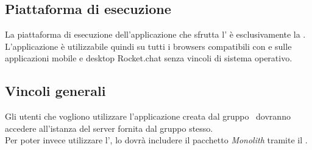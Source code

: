 \subsection{Piattaforma di esecuzione} 
La piattaforma di esecuzione dell'applicazione che sfrutta l' è esclusivamente la  . L'applicazione è utilizzabile quindi su tutti i browsers compatibili con  e sulle applicazioni mobile e desktop Rocket.chat senza vincoli di sistema operativo.

\subsection{Vincoli generali}
Gli utenti che vogliono utilizzare l'applicazione creata dal gruppo \gruppo\ dovranno accedere all'istanza del server fornita dal gruppo stesso. \\
Per poter invece utilizzare l', lo  dovrà includere il pacchetto \textit{Monolith} tramite il  . 

\newpage